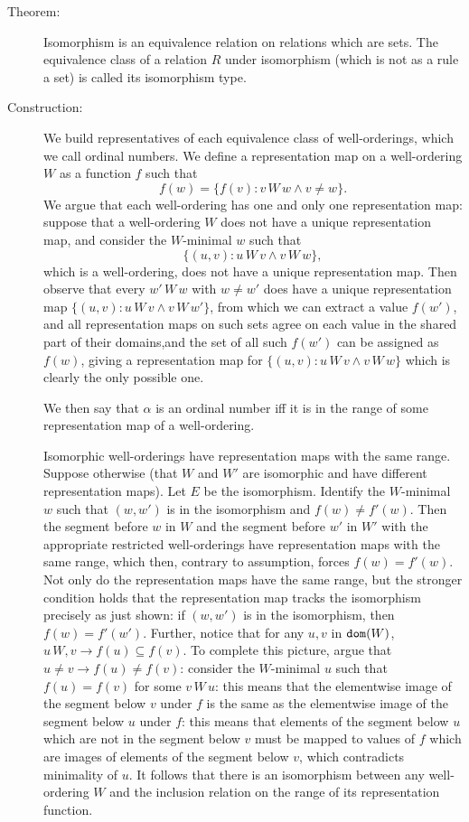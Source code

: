 \documentclass[12pt]{article}
\begin{document}
\begin{description}
\item[Theorem:]  Isomorphism is an equivalence relation on relations which are sets.  The equivalence class of a relation $R$ under isomorphism (which is not as a rule a set) is called its isomorphism type.

\item[Construction:]  We build representatives of each equivalence class of well-orderings, which we call ordinal numbers.  We define a representation map on a well-ordering $W$ as a function $f$ such that $$f(w) = \{f(v):v \, W \, w\wedge v \neq w\}.$$  We argue that each well-ordering has one and only one representation map:  suppose that a well-ordering $W$
does not have a unique representation map, and consider the $W$-minimal $w$ such that $$\{(u,v): u \, W \, v \wedge v \, W \, w\},$$ which is a well-ordering, does not have a unique representation map.  Then observe that every $w' \, W \, w$ with $w \neq w'$ does have a unique representation map $\{(u,v): u \, W \, v \wedge v \, W \, w'\}$, from which we
can extract a value $f(w')$, and all representation maps on such sets agree on each value in the shared part of their domains,and the set of all such $f(w')$ can be assigned as $f(w)$, giving a representation map for $\{(u,v): u \, W \, v \wedge v \, W \, w\}$ which is clearly the only possible one.

We then say that $\alpha$ is an ordinal number iff it is in the range of some representation map of a well-ordering.  

Isomorphic well-orderings have representation maps with the same range.  Suppose otherwise (that $W$ and $W'$ are isomorphic and have different representation maps).  Let $E$ be the isomorphism.  Identify the $W$-minimal $w$ such that $(w,w')$ is in the isomorphism and $f(w) \neq f'(w)$.  Then the segment before $w$ in $W$ and the segment before $w'$ in $W'$
with the appropriate restricted well-orderings have representation maps with the same range, which then, contrary to assumption, forces $f(w) = f'(w)$.  Not only do the representation maps have the same range, but the stronger condition holds that the representation map tracks the isomorphism precisely as just shown:  if $(w,w')$ is in the isomorphism,
then $f(w) = f'(w')$.  Further, notice that for any $u,v$ in ${\tt dom}(W)$, $u \, W, v \rightarrow f(u) \subseteq f(v)$.  To complete this picture, argue that $u \neq v \rightarrow f(u) \neq f(v)$:  consider the $W$-minimal $u$ such that $f(u) = f(v)$ for some $v \, W\, u$:  this means that the elementwise image of the segment below $v$ under $f$
is the same as the elementwise image of the segment below $u$ under $f$:  this means that elements of the segment below $u$ which are not in the segment below $v$ must be mapped to values of $f$ which are images of elements of the segment below $v$, which contradicts minimality of $u$.  It follows that there is an isomorphism between any well-ordering $W$
and the inclusion relation on the range of its representation function.


\end{description}
\end{document}
